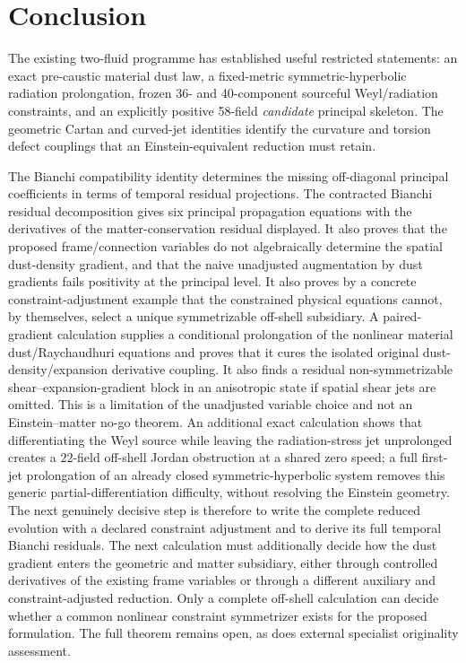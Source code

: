 \documentclass[11pt,a4paper]{article}
\begin{document}
\section{Conclusion}
The existing two-fluid programme has established useful restricted statements: an exact pre-caustic material dust law, a fixed-metric symmetric-hyperbolic radiation prolongation, frozen 36- and 40-component sourceful Weyl/radiation constraints, and an explicitly positive 58-field \emph{candidate} principal skeleton. The geometric Cartan and curved-jet identities identify the curvature and torsion defect couplings that an Einstein-equivalent reduction must retain.

The Bianchi compatibility identity determines the missing off-diagonal principal coefficients in terms of temporal residual projections. The contracted Bianchi residual decomposition gives six principal propagation equations with the derivatives of the matter-conservation residual displayed. It also proves that the proposed frame/connection variables do not algebraically determine the spatial dust-density gradient, and that the naive unadjusted augmentation by dust gradients fails positivity at the principal level. It also proves by a concrete constraint-adjustment example that the constrained physical equations cannot, by themselves, select a unique symmetrizable off-shell subsidiary. A paired-gradient calculation supplies a conditional prolongation of the nonlinear material dust/Raychaudhuri equations and proves that it cures the isolated original dust-density/expansion derivative coupling. It also finds a residual non-symmetrizable shear--expansion-gradient block in an anisotropic state if spatial shear jets are omitted. This is a limitation of the unadjusted variable choice and not an Einstein--matter no-go theorem. An additional exact calculation shows that differentiating the Weyl source while leaving the radiation-stress jet unprolonged creates a $22$-field off-shell Jordan obstruction at a shared zero speed; a full first-jet prolongation of an already closed symmetric-hyperbolic system removes this generic partial-differentiation difficulty, without resolving the Einstein geometry. The next genuinely decisive step is therefore to write the complete reduced evolution with a declared constraint adjustment and to derive its full temporal Bianchi residuals. The next calculation must additionally decide how the dust gradient enters the geometric and matter subsidiary, either through controlled derivatives of the existing frame variables or through a different auxiliary and constraint-adjusted reduction. Only a complete off-shell calculation can decide whether a common nonlinear constraint symmetrizer exists for the proposed formulation. The full theorem remains open, as does external specialist originality assessment.
\end{document}
